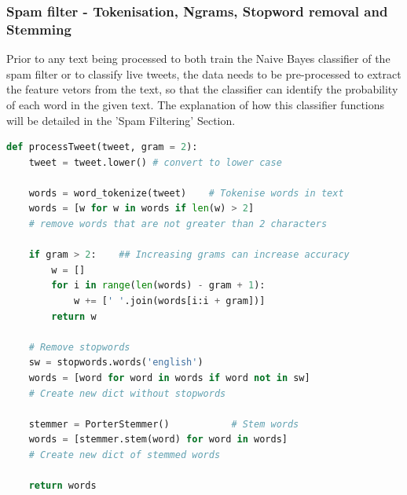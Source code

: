 \documentclass[oneside, 12pt]{article}
\begin{document}
			\newpage
			
			\subsubsection{Spam filter - Tokenisation, Ngrams, Stopword removal and Stemming}
			
			Prior to any text being processed to both train the Naive Bayes classifier of the spam filter or to classify live tweets, the data needs to be pre-processed to extract the feature vetors from the text, so that the classifier can identify the probability of each word in the given text. The explanation of how this classifier functions will be detailed in the 'Spam Filtering' Section.
			
			\begin{lstlisting}[language=python, caption=pre-processing of data prior to being used by the spam filter]
def processTweet(tweet, gram = 2):
	tweet = tweet.lower() # convert to lower case
				
	words = word_tokenize(tweet)    # Tokenise words in text
	words = [w for w in words if len(w) > 2]  
	# remove words that are not greater than 2 characters
				
	if gram > 2:    ## Increasing grams can increase accuracy
		w = []
		for i in range(len(words) - gram + 1):
			w += [' '.join(words[i:i + gram])]
		return w
				
	# Remove stopwords
	sw = stopwords.words('english')
	words = [word for word in words if word not in sw]
	# Create new dict without stopwords
				
	stemmer = PorterStemmer()           # Stem words
	words = [stemmer.stem(word) for word in words]
	# Create new dict of stemmed words
				
	return words
			\end{lstlisting}
			
\end{document}
